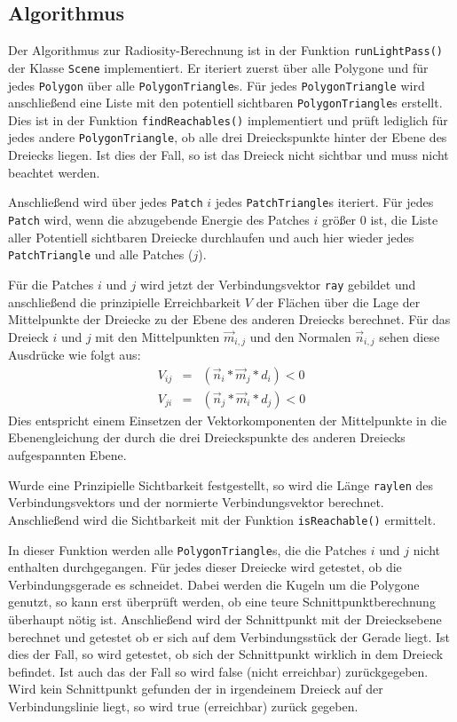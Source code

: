 \documentclass[final,a4paper,11pt,notitlepage,halfparskip]{scrreprt}
\begin{document}
\subsection{Algorithmus}
Der Algorithmus zur Radiosity-Berechnung ist in der Funktion
\texttt{runLightPass()} der Klasse \texttt{Scene} implementiert. Er iteriert 
zuerst über alle Polygone und für jedes \texttt{Polygon} über alle 
\texttt{PolygonTriangle}s. Für jedes \texttt{PolygonTriangle} wird 
anschließend eine Liste mit den potentiell sichtbaren \texttt{PolygonTriangle}s
erstellt. Dies ist in der Funktion \texttt{findReachables()} implementiert und
prüft lediglich für jedes andere \texttt{PolygonTriangle}, ob alle drei 
Dreieckspunkte hinter der Ebene des Dreiecks liegen. Ist dies der Fall, so ist 
das Dreieck nicht sichtbar und muss nicht beachtet werden.

Anschließend wird über jedes \texttt{Patch} $i$ jedes \texttt{PatchTriangle}s
iteriert. Für jedes \texttt{Patch} wird, wenn die abzugebende Energie des
Patches $i$ größer $0$ ist, die Liste aller Potentiell sichtbaren
Dreiecke durchlaufen und auch hier wieder jedes \texttt{PatchTriangle} und alle
Patches ($j$). 

Für die Patches $i$ und $j$ wird jetzt der Verbindungsvektor \texttt{ray}
gebildet und anschließend die prinzipielle Erreichbarkeit $V$ der Flächen 
über die Lage der Mittelpunkte der Dreiecke zu der Ebene des anderen Dreiecks 
berechnet. Für das Dreieck $i$ und $j$ mit den Mittelpunkten $\vec{m}_{i,j}$ und
den Normalen $\vec{n}_{i,j}$ sehen diese Ausdrücke wie folgt aus:
\begin{eqnarray*}
  V_{ij} &=& (\vec{n}_i * \vec{m}_j * d_i) < 0\\
  V_{ji} &=& (\vec{n}_j * \vec{m}_i * d_j) < 0   
\end{eqnarray*}
Dies entspricht einem Einsetzen der Vektorkomponenten der Mittelpunkte in die
Ebenengleichung der durch die drei Dreieckspunkte des anderen Dreiecks
aufgespannten Ebene.

Wurde eine Prinzipielle Sichtbarkeit festgestellt, so wird die Länge
\texttt{raylen} des Verbindungsvektors und der normierte Verbindungsvektor
berechnet. Anschließend wird die Sichtbarkeit mit der Funktion
\texttt{isReachable()} ermittelt.

In dieser Funktion werden alle \texttt{PolygonTriangle}s, die die Patches $i$
und $j$ nicht enthalten durchgegangen. Für jedes dieser Dreiecke wird getestet,
ob die Verbindungsgerade es schneidet. Dabei werden die Kugeln um die Polygone
genutzt, so kann erst überprüft werden, ob eine teure Schnittpunktberechnung
überhaupt nötig ist. Anschließend wird der Schnittpunkt mit der Dreiecksebene 
berechnet und getestet ob er sich auf dem Verbindungsstück der Gerade liegt. Ist
dies der Fall, so wird getestet, ob sich der Schnittpunkt wirklich in dem
Dreieck befindet. Ist auch das der Fall so wird false (nicht erreichbar)
zurückgegeben. Wird kein Schnittpunkt gefunden der in irgendeinem Dreieck auf
der Verbindungslinie liegt, so wird true (erreichbar) zurück gegeben.
\end{document}

